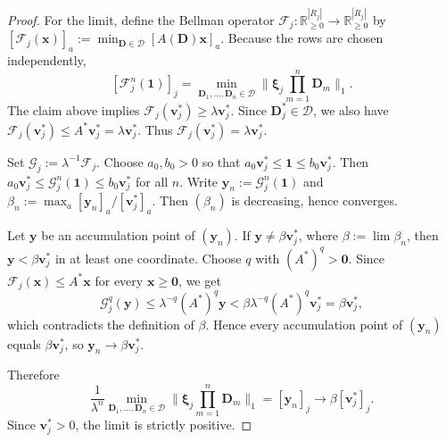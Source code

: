 \documentclass[10pt,a4paper]{amsart}
\newcommand*{\bbbxi}{\boldsymbol{\xi}}
\begin{document}
\begin{proof}
For the limit, define the Bellman operator
$\mathcal F_j:\mathbb R_{\ge 0}^{|R_j|}\to\mathbb R_{\ge 0}^{|R_j|}$ by
$[\mathcal F_j(\mathbf x)]_a:=\min_{\mathbf D\in\mathcal D}[A(\mathbf D)\mathbf x]_a$.
Because the rows are chosen independently,
\[
[\mathcal F_j^n(\mathbf 1)]_j
=
\min_{\mathbf D_1,\ldots,\mathbf D_n\in\mathcal D}
\bigg\|
\bbbxi_j\prod_{m=1}^n \mathbf D_m
\bigg\|_1.
\]
The claim above implies $\mathcal F_j(\mathbf v_j^*)\ge \lambda\mathbf v_j^*$.
Since $\mathbf D_j^*\in\mathcal D$, we also have
$\mathcal F_j(\mathbf v_j^*)\le A^*\mathbf v_j^*=\lambda\mathbf v_j^*$.
Thus $\mathcal F_j(\mathbf v_j^*)=\lambda\mathbf v_j^*$.

Set $\mathcal G_j:=\lambda^{-1}\mathcal F_j$.
Choose $a_0,b_0>0$ so that $a_0\mathbf v_j^*\le \mathbf 1\le b_0\mathbf v_j^*$.
Then $a_0\mathbf v_j^*\le \mathcal G_j^n(\mathbf 1)\le b_0\mathbf v_j^*$ for all $n$.
Write $\mathbf y_n:=\mathcal G_j^n(\mathbf 1)$ and
$\beta_n:=\max_a[\mathbf y_n]_a/[\mathbf v_j^*]_a$.
Then $(\beta_n)$ is decreasing, hence converges.

Let $\mathbf y$ be an accumulation point of $(\mathbf y_n)$.
If $\mathbf y\ne \beta\mathbf v_j^*$, where $\beta:=\lim\beta_n$, then
$\mathbf y<\beta\mathbf v_j^*$ in at least one coordinate.
Choose $q$ with $(A^*)^q>\mathbf 0$.
Since $\mathcal F_j(\mathbf x)\le A^*\mathbf x$ for every $\mathbf x\ge \mathbf 0$, we get
\[
\mathcal G_j^q(\mathbf y)
\le
\lambda^{-q}(A^*)^q\mathbf y
<
\beta\lambda^{-q}(A^*)^q\mathbf v_j^*
=
\beta\mathbf v_j^*,
\]
which contradicts the definition of $\beta$.
Hence every accumulation point of $(\mathbf y_n)$ equals $\beta\mathbf v_j^*$, so
$\mathbf y_n\to \beta\mathbf v_j^*$.

Therefore
\[
\frac{1}{\lambda^n}
\min_{\mathbf D_1,\ldots,\mathbf D_n\in\mathcal D}
\bigg\|
\bbbxi_j\prod_{m=1}^n \mathbf D_m
\bigg\|_1
=
[\mathbf y_n]_j
\to
\beta[\mathbf v_j^*]_j.
\]
Since $\mathbf v_j^*>0$, the limit is strictly positive.
\end{proof}
\end{document}
